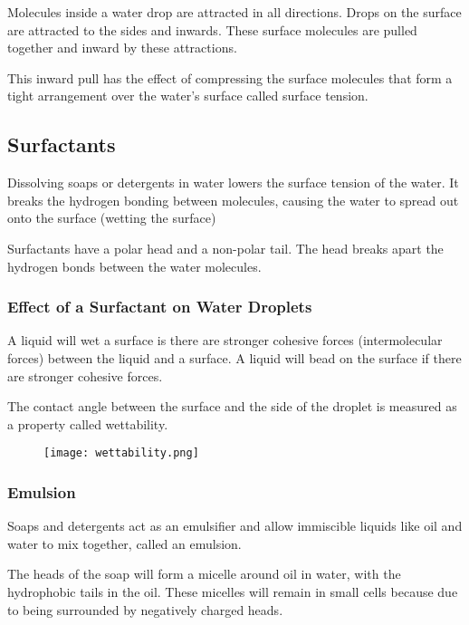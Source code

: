 		Molecules inside a water drop are attracted in all directions. Drops on the surface are attracted to the sides and inwards. These surface molecules are pulled together and inward by these attractions.

		This inward pull has the effect of compressing the surface molecules that form a tight arrangement over the water's surface called surface tension.

	\subsection{Surfactants}
	
		Dissolving soaps or detergents in water lowers the surface tension of the water. It breaks the hydrogen bonding between molecules, causing the water to spread out onto the surface (wetting the surface)

		Surfactants have a polar head and a non-polar tail. The head breaks apart the hydrogen bonds between the water molecules.

		\subsubsection{Effect of a Surfactant on Water Droplets}
		
			A liquid will wet a surface is there are stronger cohesive forces (intermolecular forces) between the liquid and a surface. A liquid will bead on the surface if there are stronger cohesive forces.

			The contact angle between the surface and the side of the droplet is measured as a property called wettability.

		\begin{figure}[H]
			\centering
			\texttt{[image: wettability.png]}
		\end{figure}

		\subsubsection{Emulsion}
		
			Soaps and detergents act as an emulsifier and allow immiscible liquids like oil and water to mix together, called an emulsion.

			The heads of the soap will form a micelle around oil in water, with the hydrophobic tails in the oil. These micelles will remain in small cells because due to being surrounded by negatively charged heads.

